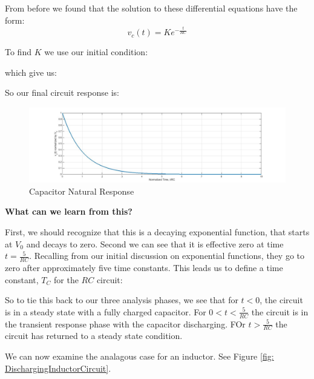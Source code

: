 \documentclass{handout}
\begin{document}
From before we found that the solution to these differential equations have the form:
\begin{equation}
v_c(t)=Ke^{-\frac{t}{RC}}
\end{equation}

To find $K$ we use our initial condition:
\soln{0.5in}{
\[
v_c(0)=V_0
\]
}

which give us:
\soln{0.5in}{
\[
K=V_0
\]
}

So our final circuit response is:
\soln{0.5in}{
\[
v_c(t)=V_0e^{-\frac{t}{RC}}
\] 
}

\begin{figure} [h!]
\centering
\includegraphics[width=1\textwidth]{CapacitorNaturalResponse.jpg}
\caption{Capacitor Natural Response}
\label{fig: CapacitorNaturalResponse}
\end{figure}

\textbf{What can we learn from this?}

First, we should recognize that this is a decaying exponential function, that starts at $V_0$ and decays to zero.  Second we can see that it is effective zero at time $t=\frac{5}{RC}$.  Recalling from our initial discussion on exponential functions, they go to zero after approximately five time constants.  This leads us to define a time constant, $T_C$ for the $RC$ circuit:
\soln{0.5in}{
\[
T_C = RC
\]
}

So to tie this back to our three analysis phases, we see that for $t<0$, the circuit is in a steady state with a fully charged capacitor.  For $0<t<\frac{5}{RC}$ the circuit is in the transient response phase with the capacitor discharging.  FOr $t>\frac{5}{RC}$ the circuit has returned to a steady state condition.

\newpage
\clearpage
\pagebreak

We can now examine the analagous case for an inductor.  See Figure \ref{fig: DischargingInductorCircuit}.
\end{document}
